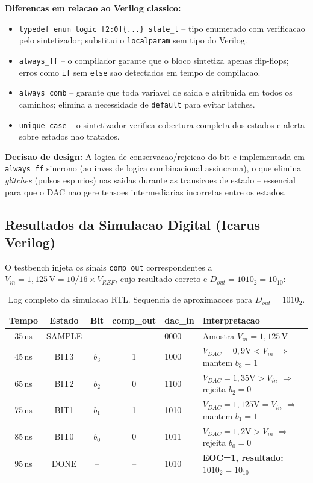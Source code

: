 \documentclass[12pt, a4paper]{article}
\begin{document}
\textbf{Diferencas em relacao ao Verilog classico:}
\begin{itemize}
  \item \texttt{typedef enum logic [2:0]\{...\} state\_t} -- tipo enumerado com verificacao
        pelo sintetizador; substitui o \texttt{localparam} sem tipo do Verilog.
  \item \texttt{always\_ff} -- o compilador garante que o bloco sintetiza apenas flip-flops;
        erros como \texttt{if} sem \texttt{else} sao detectados em tempo de compilacao.
  \item \texttt{always\_comb} -- garante que toda variavel de saida e atribuida em todos os
        caminhos; elimina a necessidade de \texttt{default} para evitar latches.
  \item \texttt{unique case} -- o sintetizador verifica cobertura completa dos estados e
        alerta sobre estados nao tratados.
\end{itemize}

\textbf{Decisao de design:} A logica de conservacao/rejeicao do bit e implementada em
\texttt{always\_ff} sincrono (ao inves de logica combinacional assincrona), o que elimina
\textit{glitches} (pulsos espurios) nas saidas durante as transicoes de estado -- essencial
para que o DAC nao gere tensoes intermediarias incorretas entre os estados.

\subsection{Resultados da Simulacao Digital (Icarus Verilog)}

O testbench injeta os sinais \texttt{comp\_out} correspondentes a $V_{in} = 1{,}125\,\text{V}
= 10/16 \times V_{REF}$, cujo resultado correto e $D_{out} = 1010_2 = 10_{10}$:

\begin{table}[H]
\centering
\caption{Log completo da simulacao RTL. Sequencia de aproximacoes para $D_{out} = 1010_2$.}
\label{tab:sim_digital}
\begin{tabular}{ccccll}
\toprule
\textbf{Tempo} & \textbf{Estado} & \textbf{Bit} & \textbf{comp\_out} & \textbf{dac\_in} & \textbf{Interpretacao}\\
\midrule
35\,ns  & SAMPLE & --   & --  & 0000 & Amostra $V_{in}=1{,}125\,\text{V}$ \\
45\,ns  & BIT3   & $b_3$ & 1  & 1000 & $V_{DAC}=0{,}9\text{V} < V_{in}$ $\Rightarrow$ mantem $b_3=1$ \\
65\,ns  & BIT2   & $b_2$ & 0  & 1100 & $V_{DAC}=1{,}35\text{V} > V_{in}$ $\Rightarrow$ rejeita $b_2=0$ \\
75\,ns  & BIT1   & $b_1$ & 1  & 1010 & $V_{DAC}=1{,}125\text{V} = V_{in}$ $\Rightarrow$ mantem $b_1=1$ \\
85\,ns  & BIT0   & $b_0$ & 0  & 1011 & $V_{DAC}=1{,}2\text{V} > V_{in}$ $\Rightarrow$ rejeita $b_0=0$ \\
95\,ns  & DONE   & --   & --  & 1010 & \textbf{EOC=1, resultado: $1010_2 = 10_{10}$} \\
\bottomrule
\end{tabular}
\end{table}
\end{document}
